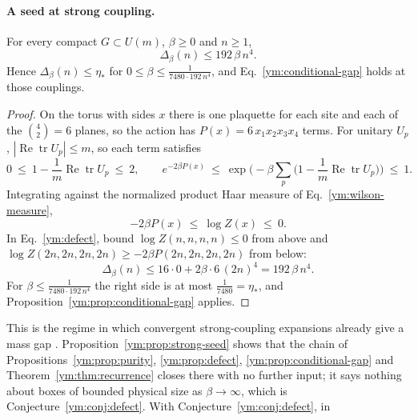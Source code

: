 \paragraph{A seed at strong coupling.}
\begin{proposition}\label{ym:prop:strong-seed}
For every compact $G\subset U(m)$, $\beta\ge0$ and $n\ge1$,
\begin{equation}\label{ym:strong-seed}
 \Delta_\beta(n)\le192\,\beta\,n^4 .
\end{equation}
Hence $\Delta_\beta(n)\le\eta_*$ for $0\le\beta\le\frac{1}{7480\cdot192\,n^4}$,
and Eq.~\eqref{ym:conditional-gap} holds at those couplings.
\end{proposition}
\begin{proof}
On the torus with sides $x$ there is one plaquette for each site and each of
the $\binom42=6$ planes, so the action has
$P(x)=6\,x_1x_2x_3x_4$ terms. For unitary $U_p$,
$|\operatorname{Re}\operatorname{tr}U_p|\le m$, so each term satisfies
\begin{equation}
 0\ \le\ 1-\frac1m\operatorname{Re}\operatorname{tr}U_p\ \le\ 2,
 \qquad
 e^{-2\beta P(x)}\ \le\ \exp\Big(-\beta\sum_p\Big(1-\frac1m
 \operatorname{Re}\operatorname{tr}U_p\Big)\Big)\ \le\ 1 .
\end{equation}
Integrating against the normalized product Haar measure of
Eq.~\eqref{ym:wilson-measure},
\begin{equation}\label{ym:log-z-bounds}
 -2\beta P(x)\ \le\ \log Z(x)\ \le\ 0 .
\end{equation}
In Eq.~\eqref{ym:defect}, bound $\log Z(n,n,n,n)\le0$ from above and
$\log Z(2n,2n,2n,2n)\ge-2\beta P(2n,2n,2n,2n)$ from below:
\begin{equation}
 \Delta_\beta(n)\le16\cdot0+2\beta\cdot6\,(2n)^4=192\,\beta\,n^4 .
\end{equation}
For $\beta\le\frac{1}{7480\cdot192\,n^4}$ the right side is at most
$\frac1{7480}=\eta_*$, and Proposition~\ref{ym:prop:conditional-gap} applies.
\end{proof}
This is the regime in which convergent strong-coupling expansions already give
a mass gap \cite{OsterwalderSeiler1978}. Proposition~\ref{ym:prop:strong-seed}
shows that the chain of Propositions~\ref{ym:prop:purity},
\ref{ym:prop:defect}, \ref{ym:prop:conditional-gap} and
Theorem~\ref{ym:thm:recurrence} closes there with no further input; it says
nothing about boxes of bounded physical size as $\beta\to\infty$, which is
Conjecture~\ref{ym:conj:defect}. With Conjecture~\ref{ym:conj:defect}, in
